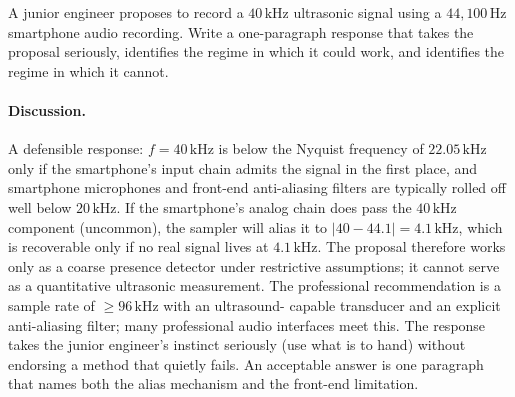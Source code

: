 \begin{exercise}
A junior engineer proposes to record a $40 \,\si{\kilo\hertz}$
ultrasonic signal using a $44{,}100 \,\si{\hertz}$ smartphone audio
recording. Write a one-paragraph response that takes the proposal
seriously, identifies the regime in which it could work, and
identifies the regime in which it cannot.

\paragraph{Discussion.}
A defensible response: $f = 40 \,\si{\kilo\hertz}$ is below the
Nyquist frequency of $22.05 \,\si{\kilo\hertz}$ only if the
smartphone's input chain admits the signal in the first place,
and smartphone microphones and front-end anti-aliasing filters
are typically rolled off well below $20 \,\si{\kilo\hertz}$. If
the smartphone's analog chain does pass the $40 \,\si{\kilo
\hertz}$ component (uncommon), the sampler will alias it to
$|40 - 44.1| = 4.1 \,\si{\kilo\hertz}$, which is recoverable only
if no real signal lives at $4.1 \,\si{\kilo\hertz}$. The proposal
therefore works only as a coarse presence detector under
restrictive assumptions; it cannot serve as a quantitative
ultrasonic measurement. The professional recommendation is a
sample rate of $\geq 96 \,\si{\kilo\hertz}$ with an ultrasound-
capable transducer and an explicit anti-aliasing filter; many
professional audio interfaces meet this. The response takes the
junior engineer's instinct seriously (use what is to hand)
without endorsing a method that quietly fails. An acceptable
answer is one paragraph that names both the alias mechanism and
the front-end limitation.
\end{exercise}

